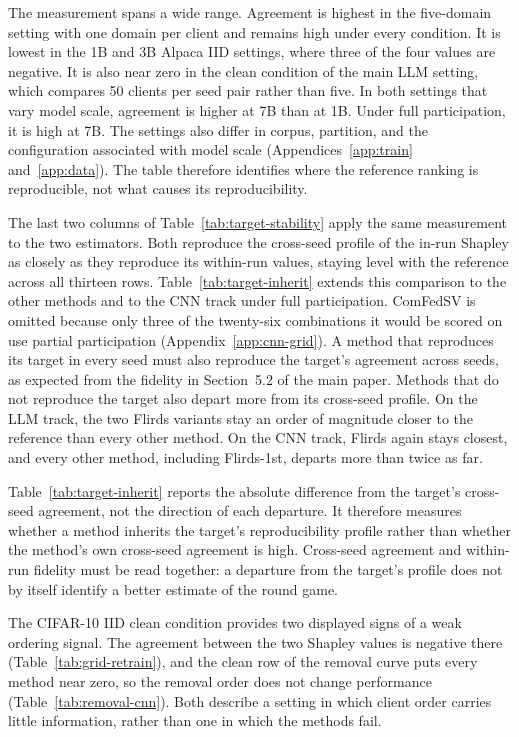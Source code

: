 \documentclass[letterpaper]{article} %
\theoremstyle{definition}
\begin{document}
The measurement spans a wide range. Agreement is highest in the five-domain
setting with one domain per client and remains high under every condition. It
is lowest in the 1B and 3B Alpaca IID settings, where three of the four values
are negative. It is also near zero in the clean condition of the main LLM
setting, which compares 50 clients per seed pair rather than five. In both
settings that vary model scale, agreement is higher at 7B than at 1B. Under
full participation, it is high at 7B. The settings also differ in corpus,
partition, and the configuration associated with model scale
(Appendices~\ref{app:train} and~\ref{app:data}). The table therefore identifies
where the reference ranking is reproducible, not what causes its
reproducibility.

The last two columns of Table~\ref{tab:target-stability} apply the same
measurement to the two estimators. Both reproduce the cross-seed profile of
the in-run Shapley as closely as they reproduce its within-run values, staying
level with the reference across all thirteen rows.
Table~\ref{tab:target-inherit} extends this comparison
to the other methods and to the CNN track under full participation. ComFedSV
is omitted because only three of the twenty-six combinations it would be
scored on use partial participation (Appendix~\ref{app:cnn-grid}). A method
that reproduces its target in every seed must also reproduce the target's
agreement across seeds, as expected from the fidelity in
Section~5.2 of the main paper. Methods that do not reproduce the target also
depart more from its
cross-seed profile. On the LLM track, the two Flirds variants stay an order of
magnitude closer to the reference than every other method. On the CNN track,
Flirds again stays closest, and every other method, including Flirds-1st,
departs more than twice as far.

Table~\ref{tab:target-inherit} reports the absolute difference from the target's
cross-seed agreement, not the direction of each departure. It therefore
measures whether a method inherits the target's reproducibility profile rather
than whether the method's own cross-seed agreement is high. Cross-seed
agreement and within-run fidelity must be read together: a departure from the
target's profile does not by itself identify a better estimate of the round
game.

The CIFAR-10 IID clean condition provides two displayed signs of a weak
ordering signal. The
agreement between the two Shapley values is negative there
(Table~\ref{tab:grid-retrain}), and the clean row of the removal curve puts
every method near zero, so the removal order does not change performance
(Table~\ref{tab:removal-cnn}). Both describe a setting in which client
order carries little information, rather than one in which the methods fail.
\end{document}
